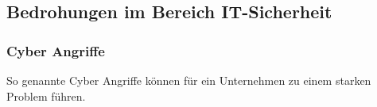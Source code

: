 
\newpage
\subsection{Bedrohungen im Bereich IT-Sicherheit}
\subsubsection{Cyber Angriffe}
So genannte Cyber Angriffe können für ein Unternehmen zu einem starken Problem führen.

\newpage